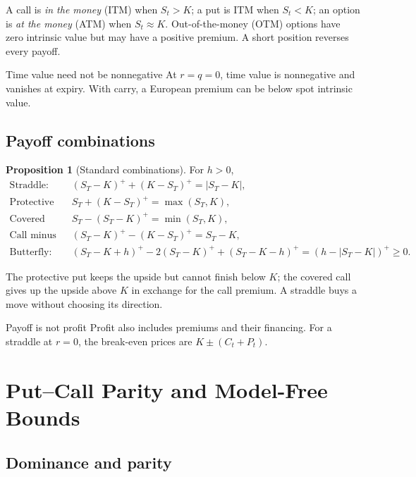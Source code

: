 \documentclass[10pt]{article}
\newcommand{\1}{\mathbf 1}
\theoremstyle{definition}
\newtheorem{proposition}[definition]{Proposition}
\begin{document}
A call is \emph{in the money} (ITM) when \(S_t>K\); a put is ITM when
\(S_t<K\); an option is \emph{at the money} (ATM) when \(S_t\approx K\).
Out-of-the-money (OTM) options have zero intrinsic value but may have a
positive premium. A short position reverses every payoff.

\begin{warningbox}{Time value need not be nonnegative}
At \(r=q=0\), time value is nonnegative and vanishes at expiry. With carry,
a European premium can be below spot intrinsic value.
\end{warningbox}

\subsection{Payoff combinations}

\begin{proposition}[Standard combinations]
For \(h>0\),
\[
\begin{aligned}
\text{Straddle:}\quad &(S_T-K)^++(K-S_T)^+=|S_T-K|,\\
\text{Protective put:}\quad &S_T+(K-S_T)^+=\max(S_T,K),\\
\text{Covered call:}\quad &S_T-(S_T-K)^+=\min(S_T,K),\\
\text{Call minus put:}\quad &(S_T-K)^+-(K-S_T)^+=S_T-K,\\
\text{Butterfly:}\quad &(S_T-K+h)^+-2(S_T-K)^++(S_T-K-h)^+
=(h-|S_T-K|)^+\ge0.
\end{aligned}
\]
\end{proposition}

The protective put keeps the upside but cannot finish below \(K\); the
covered call gives up the upside above \(K\) in exchange for the call premium.
A straddle buys a move without choosing its direction.

\begin{warningbox}{Payoff is not profit}
Profit also includes premiums and their financing. For a straddle at
\(r=0\), the break-even prices are \(K\pm(C_t+P_t)\).
\end{warningbox}

\section{Put--Call Parity and Model-Free Bounds}

\subsection{Dominance and parity}
\end{document}
